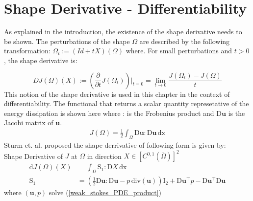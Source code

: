\section{Shape Derivative - Differentiability}
\vfill

As explained in the introduction, the existence of the shape derivative needs to be shown.
The perturbations of the shape $\Omega$ are described by the following transformation: $\Omega_t := (Id + tX )(\Omega)$ where.
For small perturbations and $t > 0$, the shape derivative is: \cite{fully_semi_paper_sturm}

\begin{equation}\label{shape_derrivative_t_limit}
	DJ(\Omega)(X) := \left(\frac{\partial}{\partial t}J(\Omega_t)\right)\bigg\rvert_{t=0} = \lim_{t \to 0} \frac{J(\Omega_t)-J(\Omega)}{t}
\end{equation}
This notion of the shape derivative is used in this chapter in the context of differentiability. The functional that returns a scalar quantity 
represetative of the energy dissipation is shown here where : is the Frobenius product and $\mathrm{D} \mathbf{u}$ is the Jacobi matrix of $\mathbf{u}$.
\begin{align}\label{energy_dissipation_equation}
	J(\Omega) = \frac{1}{2} \int_{\Omega} \mathrm{D} \mathbf{u} : \mathrm{D} \mathbf{u} \, \mathrm{dx}
\end{align}
Sturm et. al. \cite{nearly_conformal_paper} proposed the shape derrivative of following form is given by: \\
Shape Derivative of $J$ at $\Omega$ in direction $ X \in [C^{0,1}(\bar{\Omega})]^2 $
\begin{align}\label{shape_derivative_S1}
	\mathrm{d}J(\Omega)(X) &= \int_{\Omega} \mathrm{S}_1 : \mathrm{D}X \, \mathrm{dx} \\
	\mathrm{S}_1 &= \left( \frac{1}{2}\mathrm{D} \mathbf{u} : \mathrm{D} \mathbf{u} - p \, \mathrm{div}(\mathbf{u}) \right)
	\mathrm{I}_2 + \mathrm{D} \mathbf{u}^{\top}p - \mathrm{D} \mathbf{u}^{\top} \mathrm{D} \mathbf{u}
\end{align}
where $(\mathbf{u},p)$ solve (\ref*{weak_stokes_PDE_product})
